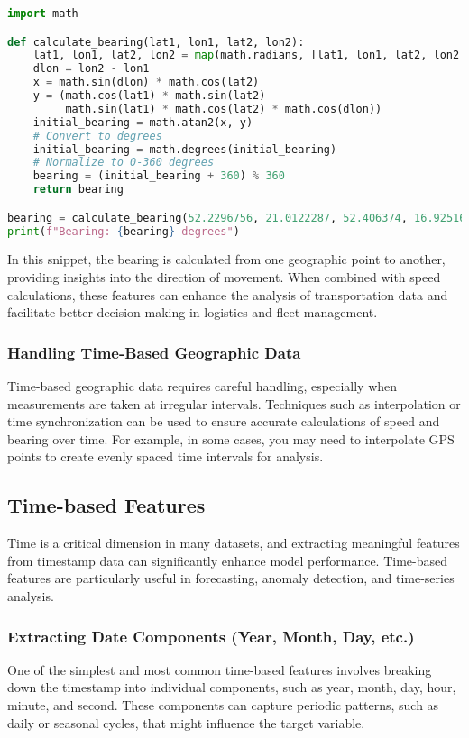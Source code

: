 \documentclass{article}
\begin{document}
\begin{lstlisting}[language=Python]
import math

def calculate_bearing(lat1, lon1, lat2, lon2):
    lat1, lon1, lat2, lon2 = map(math.radians, [lat1, lon1, lat2, lon2])
    dlon = lon2 - lon1
    x = math.sin(dlon) * math.cos(lat2)
    y = (math.cos(lat1) * math.sin(lat2) -
         math.sin(lat1) * math.cos(lat2) * math.cos(dlon))
    initial_bearing = math.atan2(x, y)
    # Convert to degrees
    initial_bearing = math.degrees(initial_bearing)
    # Normalize to 0-360 degrees
    bearing = (initial_bearing + 360) % 360
    return bearing

bearing = calculate_bearing(52.2296756, 21.0122287, 52.406374, 16.9251681)
print(f"Bearing: {bearing} degrees")
\end{lstlisting}

In this snippet, the bearing is calculated from one geographic point to another, providing insights into the direction of movement. When combined with speed calculations, these features can enhance the analysis of transportation data and facilitate better decision-making in logistics and fleet management.

\subsubsection{Handling Time-Based Geographic Data}
Time-based geographic data requires careful handling, especially when measurements are taken at irregular intervals. Techniques such as interpolation or time synchronization can be used to ensure accurate calculations of speed and bearing over time. For example, in some cases, you may need to interpolate GPS points to create evenly spaced time intervals for analysis.

\subsection{Time-based Features}
Time is a critical dimension in many datasets, and extracting meaningful features from timestamp data can significantly enhance model performance. Time-based features are particularly useful in forecasting, anomaly detection, and time-series analysis.

\subsubsection{Extracting Date Components (Year, Month, Day, etc.)}
One of the simplest and most common time-based features involves breaking down the timestamp into individual components, such as year, month, day, hour, minute, and second. These components can capture periodic patterns, such as daily or seasonal cycles, that might influence the target variable.
\end{document}
